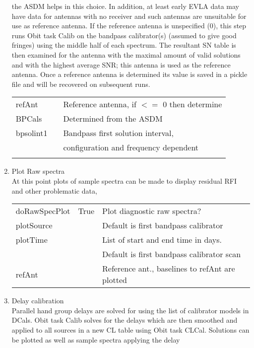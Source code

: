 \documentclass[11pt]{article}
\begin{document}
\begin{enumerate}
the ASDM helps in this choice.
In addition, at least early EVLA data may have data for antennas with
no receiver and such antennas are unsuitable for use as reference
antenna.
If the reference antenna is unspecified (0),
this step runs Obit task Calib on the bandpass calibrator(s) (assumed to
give good fringes) using the middle half of each spectrum.
The resultant SN table is then examined for the antenna with the
maximal amount of valid solutions and with the highest average SNR;
this antenna is used as the reference antenna.
Once a reference antenna is determined its value is saved in a pickle
file and will be recovered on subsequent runs.
\begin{center}
\begin{tabular}{|l|c|l|}
\hline
refAnt  &  & Reference antenna, if $<=$ 0 then determine \\
 BPCals &  & Determined from the ASDM \\
 bpsolint1 &  &  Bandpass first solution interval, \\
 & & configuration and  frequency dependent\\
  &  &  \\
\hline
\end{tabular}
\end{center}
%
\item Plot Raw spectra\\
At this point plots of sample spectra can be made to display residual
RFI and other problematic data,
\begin{center}
\begin{tabular}{|l|c|l|}
\hline
doRawSpecPlot  & True &  Plot diagnostic raw spectra?\\
plotSource     & & Default is first bandpass calibrator\\
plotTime       & & List of start and end time in days.\\
  &  & Default is first bandpass calibrator scan\\
refAnt  &  & Reference ant., baselines to refAnt are plotted \\
\hline
\end{tabular}
\end{center}
\newpage
%
\item Delay calibration\\
Parallel hand group delays are solved for using the list of
calibrator models in DCals.
Obit task Calib solves for the delays which are then smoothed and
applied to all sources in a new CL table using Obit task CLCal.
Solutions can be plotted as well as sample spectra applying the delay

\end{enumerate}
\end{document}
